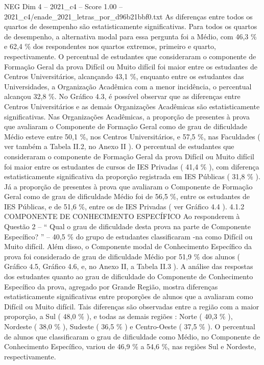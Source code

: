 \begin{textsample}{NEG Dim 4 – 2021\_c4 – Score 1.00 – 2021\_c4/enade\_2021\_letras\_por\_d96b21bbf0.txt}
As diferenças entre todos os quartos de desempenho são estatisticamente significativas.
Para todos os quartos de desempenho, a alternativa modal para essa pergunta foi a Médio, com 46,3 \% e 62,4 \% dos respondentes nos quartos extremos, primeiro e quarto, respectivamente.
O percentual de estudantes que consideraram o componente de Formação Geral da prova Difícil ou Muito difícil foi maior entre os estudantes de Centros Universitários, alcançando 43,1 \%, enquanto entre os estudantes das Universidades, a Organização Acadêmica com a menor incidência, o percentual alcançou 32,8 \%.
No Gráfico 4.3, é possível observar que as diferenças entre Centros Universitários e as demais Organizações Acadêmicas são estatisticamente significativas.
Nas Organizações Acadêmicas, a proporção de presentes à prova que avaliaram o Componente de Formação Geral como de grau de dificuldade Médio esteve entre 50,1 \%, nos Centros Universitários, e 57,5 \%, nas Faculdades ( ver também a Tabela II.2, no Anexo II ).
O percentual de estudantes que consideraram o componente de Formação Geral da prova Difícil ou Muito difícil foi maior entre os estudantes de cursos de IES Privadas ( 41,4 \% ), com diferença estatisticamente significativa da proporção registrada em IES Públicas ( 31,8 \% ).
Já a proporção de presentes à prova que avaliaram o Componente de Formação Geral como de grau de dificuldade Médio foi de 56,5 \%, entre os estudantes de IES Públicas, e de 51,6 \%, entre os de IES Privadas ( ver Gráfico 4.4 ). 4.1.2 COMPONENTE DE CONHECIMENTO ESPECÍFICO Ao responderem à Questão 2 – “ Qual o grau de dificuldade desta prova na parte de Componente Específico? ” – 40,5 \% do grupo de estudantes classificaram -na como Difícil ou Muito difícil.
Além disso, o Componente modal de Conhecimento Específico da prova foi considerado de grau de dificuldade Médio por 51,9 \% dos alunos ( Gráfico 4.5, Gráfico 4.6, e, no Anexo II, a Tabela II.3 ).
A análise das respostas dos estudantes quanto ao grau de dificuldade do Componente de Conhecimento Específico da prova, agregado por Grande Região, mostra diferenças estatisticamente significativas entre proporções de alunos que a avaliaram como Difícil ou Muito difícil.
Tais diferenças são observadas entre a região com a maior proporção, a Sul ( 48,0 \% ), e todas as demais regiões : Norte ( 40,3 \% ), Nordeste ( 38,0 \% ), Sudeste ( 36,5 \% ) e Centro-Oeste ( 37,5 \% ).
O percentual de alunos que classificaram o grau de dificuldade como Médio, no Componente de Conhecimento Específico, variou de 46,9 \% a 54,6 \%, nas regiões Sul e Nordeste, respectivamente.

\end{textsample}
